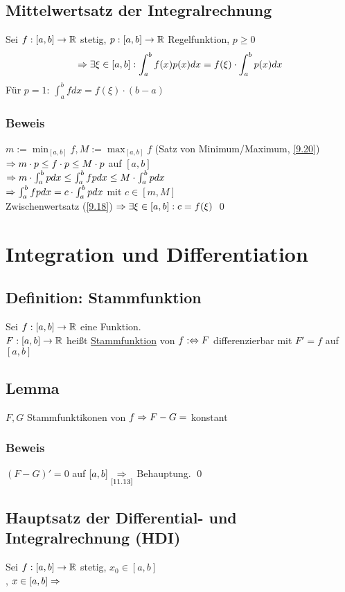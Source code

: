 \section{Mittelwertsatz der Integralrechnung}\label{14.8}
Sei $f: [a,b] \to \mathbb{R}$ stetig, $p: [a,b] \to \mathbb{R}$ Regelfunktion, $p \ge 0$
$$\Rightarrow \exists \xi \in [a,b]: \int_a^b f(x) p(x) dx = f(\xi) \cdot \int_a^b p(x) dx$$
Für $p=1$: $\int_a^b f dx = f(\xi) \cdot (b-a)$

\subsection*{Beweis}
$m := \min_{[a,b]} f, M := \max_{[a,b]} f$ (Satz von Minimum/Maximum, \ref{9.20})\\
$\Rightarrow m \cdot p \le f \cdot p \le M \cdot p$ auf $[a,b]$\\
$\Rightarrow m \cdot \int_a^b p dx \le \int_a^b fp dx \le M \cdot \int_a^b p dx$\\
$\Rightarrow \int_a^b fp dx = c \cdot \int_a^b p dx$ mit $c \in [m,M]$\\
Zwischenwertsatz (\ref{9.18}) $\Rightarrow \exists \xi \in [a,b]: c=f(\xi)$ \qed

{}
\chapter*{Integration und Differentiation}
\section{Definition: Stammfunktion}\label{14.9}
Sei $f: [a,b] \to \mathbb{R}$ eine Funktion.\\
$F: [a,b] \to \mathbb{R}$ heißt \underline{Stammfunktion} von $f :\Leftrightarrow F$ differenzierbar mit $F'=f$ auf $[a,b]$

\section{Lemma}\label{14.10}
$F, G$ Stammfunktikonen von $f \Rightarrow F-G=$ konstant

\subsection*{Beweis}
$(F-G)'=0$ auf $[a,b] \underset{\text{\ref{11.13}}}{\Rightarrow}$ Behauptung. \qed

\section{Hauptsatz der Differential- und Integralrechnung (HDI)}\label{14.11}
Sei $f: [a,b] \to \mathbb{R}$ stetig, $x_0 \in [a,b]$\\
, $x \in [a,b] \Rightarrow$

